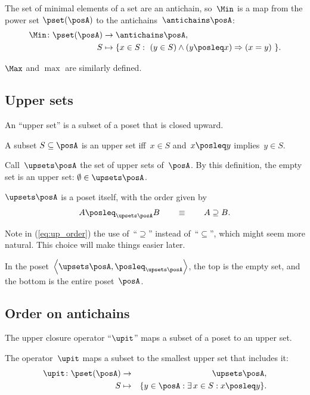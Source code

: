 The set of minimal elements of a set are an antichain, so~$\Min$
is a map from the power set $\pset(\posA)$ to the antichains~$\antichains\posA$:
\begin{align*}
\Min\colon\pset(\posA) & \rightarrow\antichains\posA,\\
S & \mapsto\{x\in S:\ (y\in S)\wedge(y\posleq x)\Rightarrow(x=y)\ \}.
\end{align*}

$\Max$ and $\max$ are similarly defined.

\subsection{Upper sets}

An ``upper set'' is a subset of a poset that is closed upward.

\begin{definition}
A subset $S\subseteq\posA$ is an upper set iff~$x\in S$ and~$x\posleq y$
implies~$y\in S$.
\end{definition}
Call~$\upsets\posA$ the set of upper sets of~$\posA$. By this
definition, the empty set is an upper set: $\emptyset\in\upsets\posA$.
\begin{lemma}
$\upsets\posA$ is a poset itself, with the order given by
\begin{equation}
A\posleq_{\upsets\posA}B\qquad\equiv\qquad A\supseteq B.\label{eq:up_order}
\end{equation}
\end{lemma}
Note in (\ref{eq:up_order}) the use of~``$\supseteq$'' instead
of~``$\subseteq$'', which might seem more natural. This choice
will make things easier later.

In the poset~$\left\langle \upsets\posA,\posleq_{\upsets\posA}\right\rangle $,
the top is the empty set, and the bottom is the entire poset~$\posA$.


\subsection{Order on antichains}

The upper closure operator ``$\upit$'' maps a subset of a poset
to an upper set.
\begin{definition}
The operator~$\upit$ maps a subset to the smallest upper set that
includes it:
\begin{eqnarray*}
\upit\colon\pset(\posA) & \rightarrow & \upsets\posA,\\
S & \mapsto & \{y\in\posA:\exists\,x\in S:x\posleq y\}.
\end{eqnarray*}
\end{definition}

